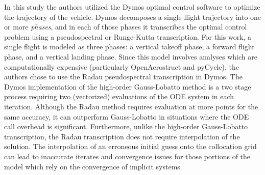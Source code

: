 In this study the authors utilized the Dymos optimal control software to optimize the trajectory of the vehicle\cite{falck2019optimal}.
Dymos decomposes a single flight trajectory into one or more \emph{phases}, and in each of those phases it transcribes the optimal control problem using a pseudospectral or Runge-Kutta transcription.
For this work, a single flight is modeled as three phases:  a vertical takeoff phase, a forward flight phase, and a vertical landing phase.
Since this model involves analyses which are computationally expensive (particularly OpenAerostruct and pyCycle), the authors chose to use the Radau pseudospectral transcription in Dymos.
The Dymos implementation of the high-order Gauss-Lobatto method is a two stage process requiring two (vectorized) evaluations of the ODE system in each iteration.
Although the Radau method requires evaluation at more points for the same accuracy, it can outperform Gauss-Lobatto in situations where the ODE call overhead is significant.
Furthermore, unlike the high-order Gauss-Lobatto transcription, the Radau transcription does not require interpolation of the solution.
The interpolation of an erroneous initial guess onto the collocation grid can lead to inaccurate iterates and convergence issues for those portions of the model which rely on the convergence of implicit systems.
